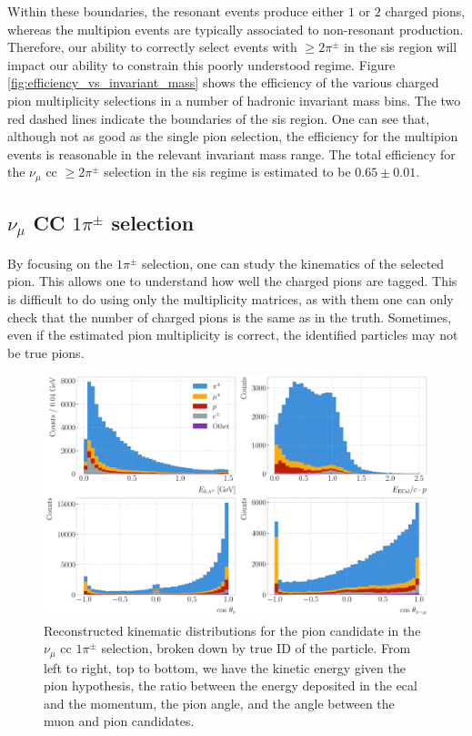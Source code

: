 Within these boundaries, the resonant events produce either $1$ or $2$ charged pions, whereas the multipion events are typically associated to non-resonant production. Therefore, our ability to correctly select events with $\geq 2\pi^{\pm}$ in the \gls{sis} region will impact our ability to constrain this poorly understood regime. Figure \ref{fig:efficiency_vs_invariant_mass} shows the efficiency of the various charged pion multiplicity selections in a number of hadronic invariant mass bins. The two red dashed lines indicate the boundaries of the \gls{sis} region. One can see that, although not as good as the single pion selection, the efficiency for the multipion events is reasonable in the relevant invariant mass range. The total efficiency for the $\nu_{\mu}$ \gls{cc} $\geq 2\pi^{\pm}$ selection in the \gls{sis} regime is estimated to be $0.65 \pm 0.01$.

\subsection[\texorpdfstring{$\nu_{\mu}$}{numu} CC \texorpdfstring{$1\pi^{\pm}$}{1pi} selection]{\boldmath\texorpdfstring{$\nu_{\mu}$}{numu} CC \boldmath\texorpdfstring{$1\pi^{\pm}$}{1pi} selection}

By focusing on the $1\pi^{\pm}$ selection, one can study the kinematics of the selected pion. This allows one to understand how well the charged pions are tagged. This is difficult to do using only the multiplicity matrices, as with them one can only check that the number of charged pions is the same as in the truth. Sometimes, even if the estimated pion multiplicity is correct, the identified particles may not be true pions.

\begin{figure}[t]
    \centering
    \includegraphics[width=.99\linewidth]{Images/GAr_selection/pion_selection_1pion_kinematics.pdf}
    \caption[Reconstructed kinematic distributions for the pion candidate in the $\nu_{\mu}$ \gls{cc} $1\pi^{\pm}$ selection.]{Reconstructed kinematic distributions for the pion candidate in the $\nu_{\mu}$ \gls{cc} $1\pi^{\pm}$ selection, broken down by true ID of the particle. From left to right, top to bottom, we have the kinetic energy given the pion hypothesis, the ratio between the energy deposited in the \gls{ecal} and the momentum, the pion angle, and the angle between the muon and pion candidates.}
    \label{fig:1pion_kinematics}
\end{figure}


